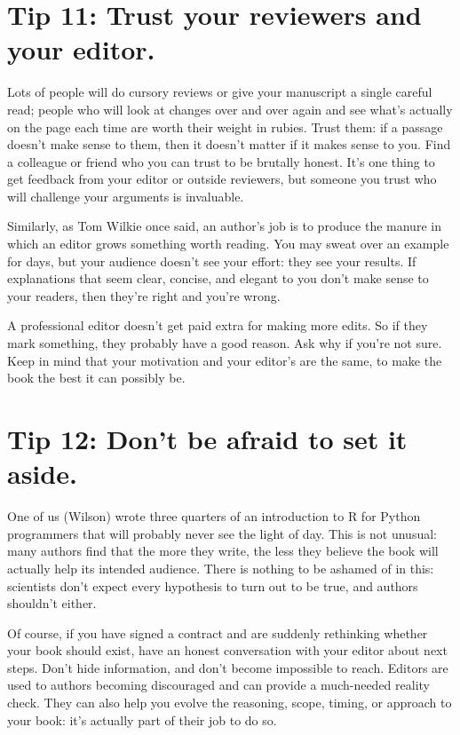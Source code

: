 \documentclass[10pt,letterpaper]{article}
\begin{document}
\section*{Tip 11: Trust your reviewers and your editor.}

Lots of people will do cursory reviews
or give your manuscript a single careful read;
people who will look at changes over and over again
and see what's actually on the page each time
are worth their weight in rubies.
Trust them:
if a passage doesn't make sense to them,
then it doesn't matter if it makes sense to you.
Find a colleague or friend who you can trust to be brutally honest.
It's one thing to get feedback from your editor or outside reviewers,
but someone you trust who will challenge your arguments is invaluable.

Similarly,
as Tom Wilkie once said,
an author's job is to produce the manure in which an editor grows something worth reading.
You may sweat over an example for days,
but your audience doesn't see your effort:
they see your results.
If explanations that seem clear, concise, and elegant to you don't make sense to your readers,
then they're right and you're wrong.

A professional editor doesn't get paid extra for making more edits. So if they mark something,
they probably have a good reason. Ask why if you're not sure. Keep in mind that
your motivation and your editor's are the same, to make
the book the best it can possibly be.

\section*{Tip 12: Don't be afraid to set it aside.}

One of us (Wilson) wrote three quarters of an introduction to R for Python programmers
that will probably never see the light of day.
This is not unusual:
many authors find that the more they write,
the less they believe the book will actually help its intended audience.
There is nothing to be ashamed of in this:
scientists don't expect every hypothesis to turn out to be true,
and authors shouldn't either.

Of course,
if you have signed a contract and are suddenly rethinking whether your book should exist,
have an honest conversation with your editor about next steps.
Don't hide information,
and don't become impossible to reach.
Editors are used to authors becoming discouraged
and can provide a much-needed reality check.
They can also help you evolve the reasoning, scope, timing, or approach to your book:
it's actually part of their job to do so.
\end{document}
